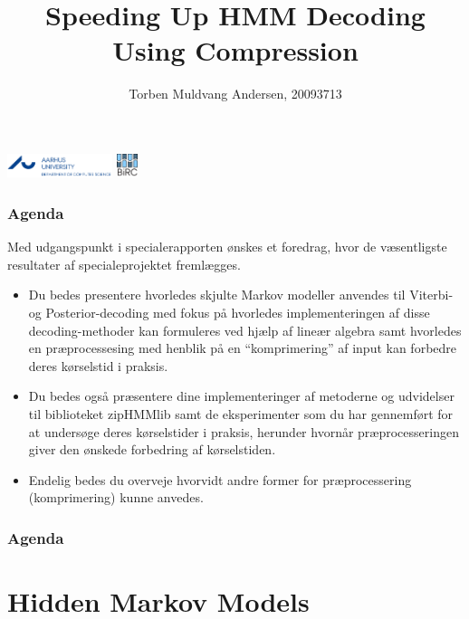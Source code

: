 \documentclass[english]{beamer}
\title{Speeding Up HMM Decoding Using Compression}
\author{Torben Muldvang Andersen, 20093713}
\date{\protect\formatdate{24}{06}{2015}}
\begin{document}
\begin{frame}
  \maketitle
  \includegraphics[height=7mm, trim=0 0 40mm 0, clip]{../logo}
  \hfill
  \includegraphics[height=7mm]{../BiRC-logo}
\end{frame}

\begin{frame}
  \frametitle{Agenda}
    Med udgangspunkt i specialerapporten ønskes et foredrag, hvor de
    væsentligste resultater af specialeprojektet fremlægges.
  \begin{itemize}
  \item Du bedes presentere hvorledes skjulte Markov modeller anvendes til
    Viterbi- og Posterior-decoding med fokus på hvorledes implementeringen af
    disse decoding-methoder kan formuleres ved hjælp af lineær algebra samt
    hvorledes en præprocessesing med henblik på en ``komprimering'' af input
    kan forbedre deres kørselstid i praksis.
  \item Du bedes også præsentere dine implementeringer af metoderne og
    udvidelser til biblioteket zipHMMlib samt de eksperimenter som du har
    gennemført for at undersøge deres kørselstider i praksis, herunder hvornår
    præprocesseringen giver den ønskede forbedring af kørselstiden.
  \item Endelig bedes du overveje hvorvidt andre former for præprocessering
    (komprimering) kunne anvedes.
  \end{itemize}
\end{frame}

\begin{frame}
  \frametitle{Agenda}
  \tableofcontents{}
\end{frame}

\section{Hidden Markov Models}
\end{document}
